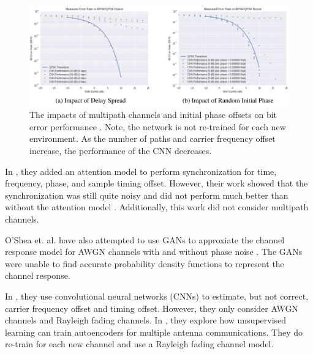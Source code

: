 \begin{figure}
\begin{center}
\includegraphics[width=16cm]{figures/osheaatt2.png}
\caption{The impacts of multipath channels and initial phase offsets on bit error performance \cite{osheaatt}.  Note, the network is not re-trained for each new environment.  As the number of paths and carrier frequency offset increase, the performance of the CNN decreases.}
\label{fig:oshea}
\end{center}
\end{figure}

In \cite{osheasynch}, they added an attention model to perform synchronization for time, frequency, phase, and sample timing offset.  However, their work showed that the synchronization was still quite noisy and did not perform much better than without the attention model \cite{osheaatt}.  Additionally, this work did not consider multipath channels. 

O'Shea et. al. have also attempted to use GANs to approxiate the channel response model for AWGN channels with and without phase noise \cite{osheavoid}.  The GANs were unable to find accurate probability density functions to represent the channel response.  

In \cite{osheacsi}, they use convolutional neural networks (CNNs) to estimate, but not correct, carrier frequency offset and timing offset.  However, they only consider AWGN channels and Rayleigh fading channels.  
In \cite{osheamimo}, they explore how unsupervised learning can train autoencoders for multiple antenna communications.  They do re-train for each new channel and use a Rayleigh fading channel model.
